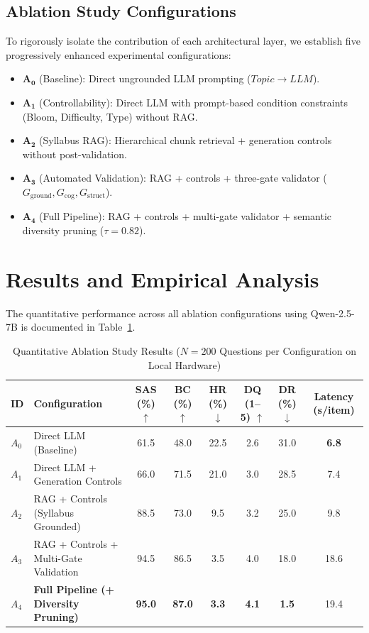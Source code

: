 \documentclass[conference]{IEEEtran}
\begin{document}
\subsection{Ablation Study Configurations}
To rigorously isolate the contribution of each architectural layer, we establish five progressively enhanced experimental configurations:
\begin{itemize}
    \item $\mathbf{A_0}$ (Baseline): Direct ungrounded LLM prompting ($Topic \to LLM$).
    \item $\mathbf{A_1}$ (Controllability): Direct LLM with prompt-based condition constraints (Bloom, Difficulty, Type) without RAG.
    \item $\mathbf{A_2}$ (Syllabus RAG): Hierarchical chunk retrieval + generation controls without post-validation.
    \item $\mathbf{A_3}$ (Automated Validation): RAG + controls + three-gate validator ($G_{\text{ground}}, G_{\text{cog}}, G_{\text{struct}}$).
    \item $\mathbf{A_4}$ (Full Pipeline): RAG + controls + multi-gate validator + semantic diversity pruning ($\tau = 0.82$).
\end{itemize}

\section{Results and Empirical Analysis}

The quantitative performance across all ablation configurations using Qwen-2.5-7B is documented in Table~\ref{tab:ablation_results}.

\begin{table}[t]
\caption{Quantitative Ablation Study Results ($N=200$ Questions per Configuration on Local Hardware)}
\label{tab:ablation_results}
\centering
\begin{tabular}{@{}llcccccc@{}}
\toprule
\textbf{ID} & \textbf{Configuration} & \textbf{SAS (\%) $\uparrow$} & \textbf{BC (\%) $\uparrow$} & \textbf{HR (\%) $\downarrow$} & \textbf{DQ (1--5) $\uparrow$} & \textbf{DR (\%) $\downarrow$} & \textbf{Latency (s/item)} \\ \midrule
$A_0$ & Direct LLM (Baseline) & 61.5 & 48.0 & 22.5 & 2.6 & 31.0 & \textbf{6.8} \\
$A_1$ & Direct LLM + Generation Controls & 66.0 & 71.5 & 21.0 & 3.0 & 28.5 & 7.4 \\
$A_2$ & RAG + Controls (Syllabus Grounded) & 88.5 & 73.0 & 9.5 & 3.2 & 25.0 & 9.8 \\
$A_3$ & RAG + Controls + Multi-Gate Validation & 94.5 & 86.5 & 3.5 & 4.0 & 18.0 & 18.6 \\
$A_4$ & \textbf{Full Pipeline (+ Diversity Pruning)} & \textbf{95.0} & \textbf{87.0} & \textbf{3.3} & \textbf{4.1} & \textbf{1.5} & 19.4 \\ \bottomrule
\end{tabular}
\end{table}
\end{document}
